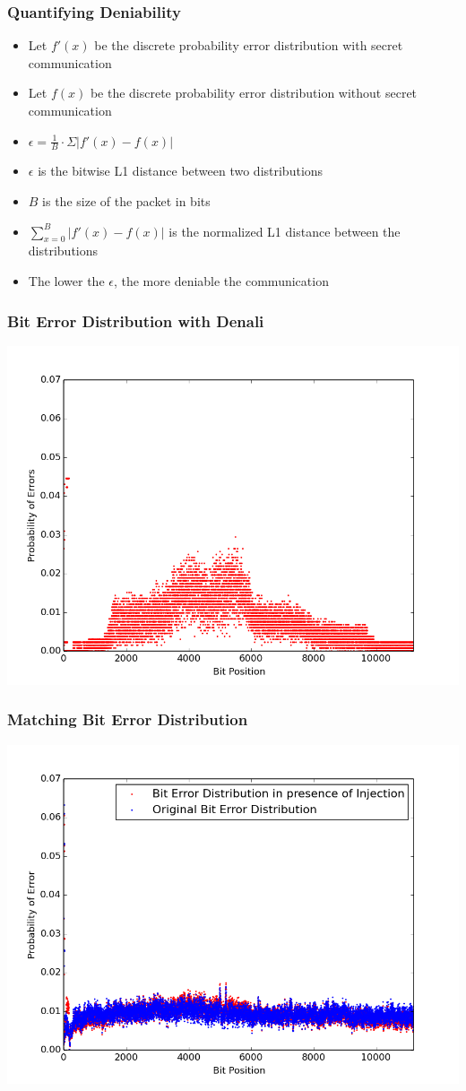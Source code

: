 \documentclass{beamer}
\begin{document}
\begin{frame}
  \frametitle{Quantifying Deniability}
    \begin{itemize}
    \item Let $f'(x)$ be the discrete probability error distribution
      with secret communication 
    \item Let $f(x)$  be the discrete probability error distribution without secret  communication
    \item $\epsilon = \frac{1}{B} \cdot \Sigma |f'(x)-f(x)|$
    \item $\epsilon$ is the bitwise L1 distance between two distributions 
    \item $B$ is the size of the packet in bits
    \item $\sum_{x=0}^B |f'(x)- f(x)|$ is the normalized L1 distance
      between the distributions
    \item The lower the $\epsilon$, the more deniable the communication
    \end{itemize}
\end{frame}

\begin{frame}
  \frametitle{Bit Error Distribution with Denali}
  \centering
  \includegraphics[width=.8\textwidth]{images/500_2_diff.png}
\end{frame}

\begin{frame}
  \frametitle{Matching Bit Error Distribution}
  \centering
  \includegraphics[width=.8\textwidth]{images/500_2_norm.png}
\end{frame}
\end{document}
